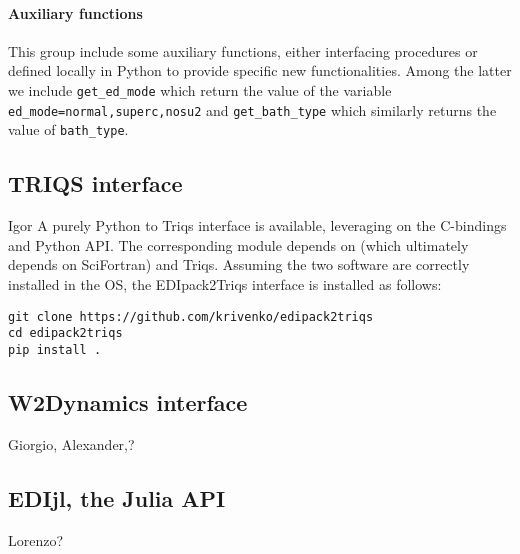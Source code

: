 \documentclass[edipack2.tex]{subfiles}
\begin{document}
\paragraph{{\bf Auxiliary functions}}
This group include some auxiliary functions, either interfacing \NAME
procedures or defined locally in Python to provide specific new
functionalities. Among the latter we include {\tt get\_ed\_mode} which
return the value of the variable {\tt ed\_mode=normal,superc,nosu2}
and {\tt get\_bath\_type} which similarly returns the value of {\tt bath\_type}.









\subsection{TRIQS interface}\label{sSecInteropTRIQS}
{\color{red} Igor }
A purely Python \NAME to Triqs interface is available, leveraging on
the C-bindings and Python API. The corresponding module depends on
\NAME (which ultimately depends on SciFortran) and Triqs.
Assuming the two software are correctly installed in the OS, the
EDIpack2Triqs interface is installed as follows:

\begin{lstlisting}[style=mybash]
git clone https://github.com/krivenko/edipack2triqs
cd edipack2triqs
pip install .
\end{lstlisting}



\subsection{W2Dynamics interface}\label{sSecInteropW2DYN}
{\color{red} Giorgio, Alexander,?}



\subsection{EDIjl, the Julia API}\label{sSecInteropEDIjl}
{\color{red} Lorenzo?}
\end{document}

